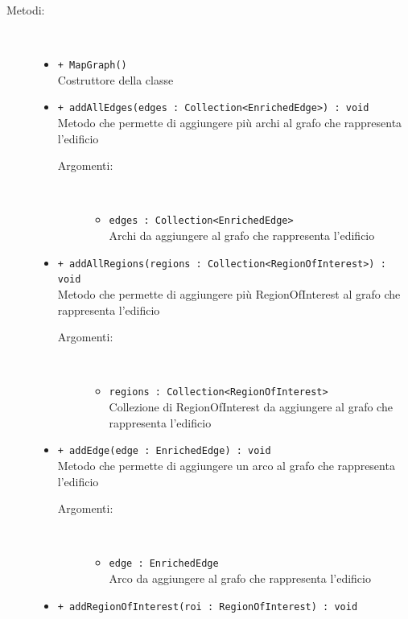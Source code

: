 \documentclass[../DefinizioneDiProdotto.tex]{subfiles}
\begin{document}
\begin{description}
\begin{itemize}
	\end{itemize}
	\item[Metodi:] \
	\begin{itemize}
		\item \texttt{+ MapGraph()}\\
		Costruttore della classe
		\item \texttt{+ addAllEdges(edges : Collection<EnrichedEdge>) : void}\\
		Metodo che permette di aggiungere più archi al grafo che rappresenta l'edificio
		\begin{description}
			\item[Argomenti:] \
			\begin{itemize}
				\item \texttt{edges : Collection<EnrichedEdge>}\\
				Archi da aggiungere al grafo che rappresenta l'edificio\end{itemize}
		\end{description}
		\item \texttt{+ addAllRegions(regions : Collection<RegionOfInterest>) : void}\\
		Metodo che permette di aggiungere più RegionOfInterest al grafo che rappresenta l'edificio
		\begin{description}
			\item[Argomenti:] \
			\begin{itemize}
				\item \texttt{regions : Collection<RegionOfInterest>}\\
				Collezione di RegionOfInterest da aggiungere al grafo che rappresenta l'edificio\end{itemize}
		\end{description}
		\item \texttt{+ addEdge(edge : EnrichedEdge) : void}\\
		Metodo che permette di aggiungere un arco al grafo che rappresenta l'edificio
		\begin{description}
			\item[Argomenti:] \
			\begin{itemize}
				\item \texttt{edge : EnrichedEdge}\\
				Arco da aggiungere al grafo che rappresenta l'edificio\end{itemize}
		\end{description}
		\item \texttt{+ addRegionOfInterest(roi : RegionOfInterest) : void}\\

\end{itemize}
\end{description}
\end{document}
